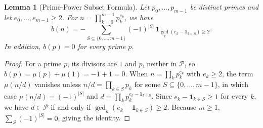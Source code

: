 \documentclass[11pt,a4paper]{article}
\newtheorem{lemma}[theorem]{Lemma}
\theoremstyle{definition}
\theoremstyle{remark}
\begin{document}
\begin{lemma}[Prime-Power Subset Formula]\label{lem:a304362-formula}
Let $p_0, \dots, p_{m-1}$ be distinct primes and let $e_0, \dots, e_{m-1} \ge 2$. For $n = \prod_{k=0}^{m-1} p_k^{e_k}$, we have
\[
  b(n) = -\sum_{S \subseteq \{0,\dots,m-1\}} (-1)^{|S|} \, \mathbf{1}_{\gcd_k(e_k - \mathbf{1}_{k \in S}) \ge 2}.
\]
In addition, $b(p) = 0$ for every prime $p$.
\end{lemma}

\begin{proof}
For a prime $p$, its divisors are $1$ and $p$, neither in $\mathcal{P}$, so $b(p) = \mu(p) + \mu(1) = -1 + 1 = 0$. When $n = \prod_k p_k^{e_k}$ with $e_k \ge 2$, the term $\mu(n/d)$ vanishes unless $n/d = \prod_{k \in S} p_k$ for some $S \subseteq \{0,\dots,m-1\}$, in which case $\mu(n/d) = (-1)^{|S|}$ and $d = \prod_k p_k^{e_k - \mathbf{1}_{k \in S}}$. Since $e_k - \mathbf{1}_{k \in S} \ge 1$ for every $k$, we have $d \in \mathcal{P}$ if and only if $\gcd_k(e_k - \mathbf{1}_{k \in S}) \ge 2$. Because $m \ge 1$, $\sum_S (-1)^{|S|} = 0$, giving the identity.
\end{proof}
\end{document}
